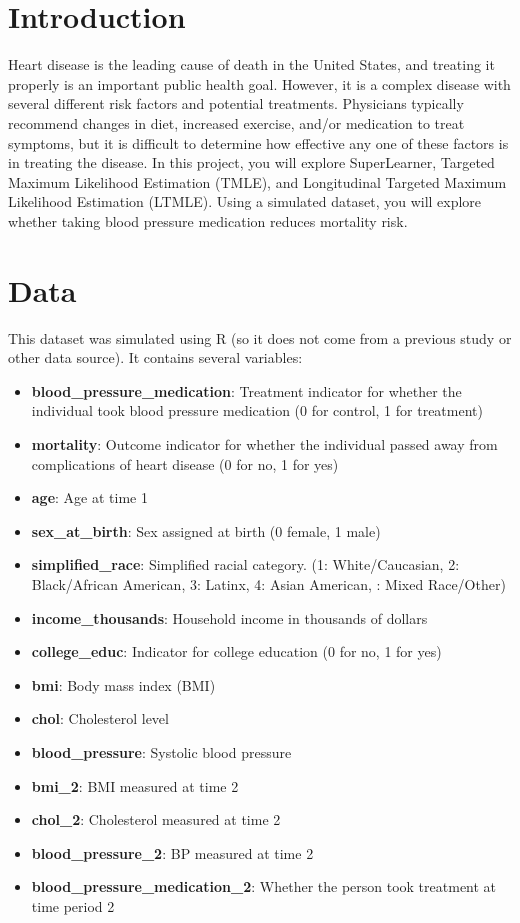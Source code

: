 \documentclass[
]{article}
\begin{document}
\hypertarget{introduction}{%
\section{Introduction}\label{introduction}}

Heart disease is the leading cause of death in the United States, and
treating it properly is an important public health goal. However, it is
a complex disease with several different risk factors and potential
treatments. Physicians typically recommend changes in diet, increased
exercise, and/or medication to treat symptoms, but it is difficult to
determine how effective any one of these factors is in treating the
disease. In this project, you will explore SuperLearner, Targeted
Maximum Likelihood Estimation (TMLE), and Longitudinal Targeted Maximum
Likelihood Estimation (LTMLE). Using a simulated dataset, you will
explore whether taking blood pressure medication reduces mortality risk.

\hypertarget{data}{%
\section{Data}\label{data}}

This dataset was simulated using R (so it does not come from a previous
study or other data source). It contains several variables:

\begin{itemize}
    \item \textbf{blood\_pressure\_medication}: Treatment indicator for whether the individual took blood pressure medication (0 for control, 1 for treatment)
    \item \textbf{mortality}: Outcome indicator for whether the individual passed away from complications of heart disease (0 for no, 1 for yes)
    \item \textbf{age}: Age at time 1
    \item \textbf{sex\_at\_birth}: Sex assigned at birth (0 female, 1 male)
    \item \textbf{simplified\_race}: Simplified racial category. (1: White/Caucasian, 2: Black/African American, 3: Latinx, 4: Asian American, : Mixed Race/Other)
    \item \textbf{income\_thousands}: Household income in thousands of dollars
    \item \textbf{college\_educ}: Indicator for college education (0 for no, 1 for yes)
    \item \textbf{bmi}: Body mass index (BMI)
    \item \textbf{chol}: Cholesterol level
    \item \textbf{blood\_pressure}: Systolic blood pressure 
    \item \textbf{bmi\_2}: BMI measured at time 2
    \item \textbf{chol\_2}: Cholesterol measured at time 2
    \item \textbf{blood\_pressure\_2}: BP measured at time 2
    \item \textbf{blood\_pressure\_medication\_2}: Whether the person took treatment at time period 2 
\end{itemize}
\end{document}
